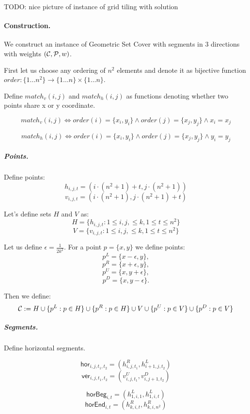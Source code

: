 TODO: nice picture of instance of grid tiling with solution

\paragraph{Construction.}
We construct an instance of Geometric Set Cover with segments in 3 directions
with weights $(\mathcal{C}, \mathcal{P}, w)$.

First let us choose any ordering of $n^2$ elements
and denote it as bijective function
$order : \{1 \ldots n^2\} \rightarrow \{1 \ldots n\} \times \{1 \ldots n\}$.

Define $match_v(i, j)$ and $match_h(i, j)$
as functions denoting whether two points share x or y coordinate.

$$match_v(i, j) \iff
order(i) = \{x_i, y_i\} \land order(j) = \{x_j, y_j\} \land x_i = x_j$$

$$match_h(i, j) \iff
order(i) = \{x_i, y_i\} \land order(j) = \{x_j, y_j\} \land y_i = y_j$$


\subparagraph{Points.}

Define points:
	$$h_{i, j, t} = (i \cdot (n^2+1) + t, j \cdot (n^2+1))$$
	$$v_{i, j, t} = (i \cdot (n^2+1), j \cdot (n^2+1) + t)$$
	
Let's define sets $H$ and $V$ as:
$$H = \{h_{i, j, t} : 1 \le i, j, \le k, 1 \le t \le n^2\}$$
$$V = \{v_{i, j, t} : 1 \le i, j, \le k, 1 \le t \le n^2\}$$
	
Let us define $\epsilon = \frac{1}{2k^2}$.
For a point $p = \{x, y\}$ we define points:
$$p^{L} = \{x - \epsilon, y\},$$
$$p^{R} = \{x + \epsilon, y\},$$
$$p^{U} = \{x, y + \epsilon\},$$
$$p^{D} = \{x, y - \epsilon\}.$$

Then we define:
$$\mathcal{C} := H \cup \{p^L : p \in H\} \cup \{p^R : p \in H\}
\cup V \cup \{p^U : p \in V\} \cup \{p^D : p \in V\} $$


\subparagraph{Segments.}
Define horizontal segments.

\newcommand{\hor}[4]{\mathsf{hor}_{#1,#2,#3,#4}}
\newcommand{\ver}[4]{\mathsf{ver}_{#1,#2,#3,#4}}
\newcommand{\horbeg}[2]{\mathsf{horBeg}_{#1,#2}}
\newcommand{\verbeg}[2]{\mathsf{verBeg}_{#1,#2}}
\newcommand{\horend}[2]{\mathsf{horEnd}_{#1,#2}}
\newcommand{\verend}[2]{\mathsf{verEnd}_{#1,#2}}

$$\hor{i}{j}{t_1}{t_2} = (h^R_{i,j,t_1}, h^L_{i+1, j, t_2})$$
$$\ver{i}{j}{t_1}{t_2} = (v^U_{i,j,t_1}, v^D_{i, j+1, t_2})$$

$$\horbeg{i}{t} = (h^L_{1, i, 1}, h^L_{1, i, t})$$
$$\horend{i}{t} = (h^R_{k, i, t}, h^R_{k, i, n^2})$$

